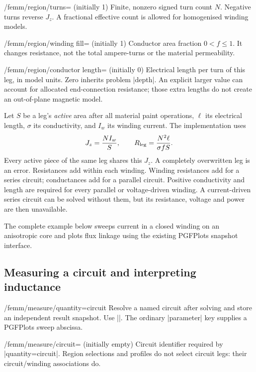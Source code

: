 \begin{key}{/femm/region/turns= (initially 1)}
Finite, nonzero signed turn count $N$. Negative turns reverse $J_z$.
A fractional effective count is allowed for homogenised winding models.
\end{key}
\begin{key}{/femm/region/winding fill= (initially 1)}
Conductor area fraction $0<f\leq1$. It changes resistance, not the total
ampere-turns or the material permeability.
\end{key}
\begin{key}{/femm/region/conductor length= (initially 0)}
Electrical length per turn of this leg, in model units. Zero inherits problem
|depth|. An explicit larger value can account for allocated end-connection
resistance; those extra lengths do not create an out-of-plane magnetic model.
\end{key}

Let $S$ be a leg's \emph{active} area after all material paint operations, $\ell$
its electrical length, $\sigma$ its conductivity, and $I_w$ its winding current.
The implementation uses
\[
 J_z=\frac{NI_w}{S},\qquad
 R_{\rm leg}=\frac{N^2\ell}{\sigma fS}.
\]
Every active piece of the same leg shares this $J_z$. A completely overwritten
leg is an error. Resistances add within each winding. Winding resistances add
for a series circuit; conductances add for a parallel circuit. Positive
conductivity and length are required for every parallel or voltage-driven
winding. A current-driven series circuit can be solved without them, but its
resistance, voltage and power are then unavailable.

The complete example below sweeps current in a closed winding on an anisotropic
core and plots flux linkage using the existing PGFPlots snapshot interface.

\subsection{Measuring a circuit and interpreting inductance}
\begin{key}{/femm/measure/quantity=circuit}
Resolve a named circuit after solving and store an independent result snapshot.
Use |\femmmeasure[name=coil-result,quantity=circuit,circuit=excitation]|.
The ordinary |parameter| key supplies a PGFPlots sweep abscissa.
\end{key}
\begin{key}{/femm/measure/circuit= (initially empty)}
Circuit identifier required by |quantity=circuit|. Region selections and profiles
do not select circuit legs: their circuit/winding associations do.
\end{key}

